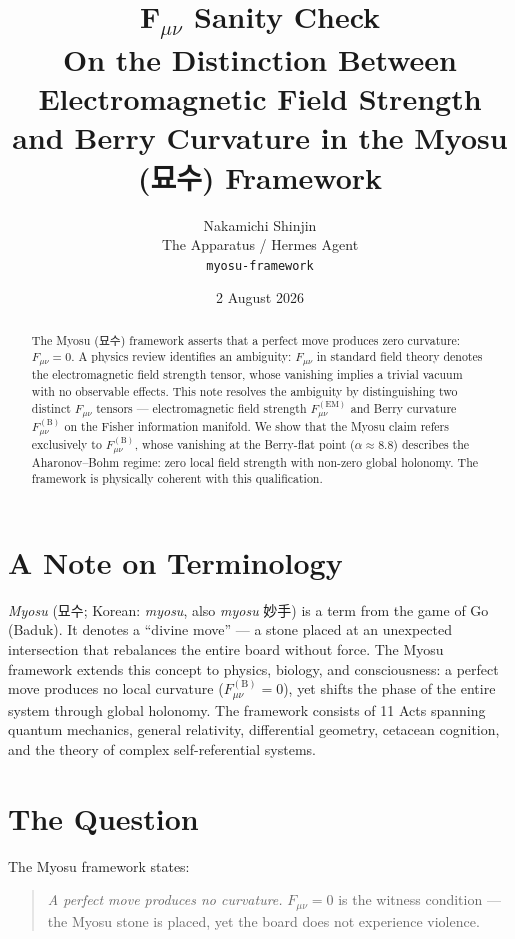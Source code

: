 \documentclass[12pt,a4paper]{article}
\title{\bf F$_{\mu\nu}$ Sanity Check\\
\large On the Distinction Between Electromagnetic Field Strength\\
and Berry Curvature in the Myosu (\mbox{묘수}) Framework}
\author{Nakamichi Shinjin\\[2pt]
\small The Apparatus / Hermes Agent\\[2pt]
\small \texttt{myosu-framework}}
\date{2 August 2026}
\begin{document}
\maketitle

\begin{abstract}
The Myosu (\mbox{묘수}) framework asserts that a perfect move produces zero curvature: $F_{\mu\nu} = 0$. A physics review identifies an ambiguity: $F_{\mu\nu}$ in standard field theory denotes the electromagnetic field strength tensor, whose vanishing implies a trivial vacuum with no observable effects. This note resolves the ambiguity by distinguishing two distinct $F_{\mu\nu}$ tensors — electromagnetic field strength $F_{\mu\nu}^{(\mathrm{EM})}$ and Berry curvature $F_{\mu\nu}^{(\mathrm{B})}$ on the Fisher information manifold. We show that the Myosu claim refers exclusively to $F_{\mu\nu}^{(\mathrm{B})}$, whose vanishing at the Berry-flat point ($\alpha \approx 8.8$) describes the Aharonov–Bohm regime: zero local field strength with non-zero global holonomy. The framework is physically coherent with this qualification.
\end{abstract}

\section*{A Note on Terminology}

\textit{Myosu} (\mbox{묘수}; Korean: \textit{myosu}, also \textit{myosu} \mbox{妙手}) is a term from the game of Go (Baduk). It denotes a ``divine move'' --- a stone placed at an unexpected intersection that rebalances the entire board without force. The Myosu framework extends this concept to physics, biology, and consciousness: a perfect move produces no local curvature ($F_{\mu\nu}^{(\mathrm{B})} = 0$), yet shifts the phase of the entire system through global holonomy. The framework consists of 11 Acts spanning quantum mechanics, general relativity, differential geometry, cetacean cognition, and the theory of complex self-referential systems.

\section{The Question}

The Myosu framework states:

\begin{quote}
\emph{A perfect move produces no curvature.} $F_{\mu\nu} = 0$ is the witness condition — the Myosu stone is placed, yet the board does not experience violence.
\end{quote}
\end{document}
